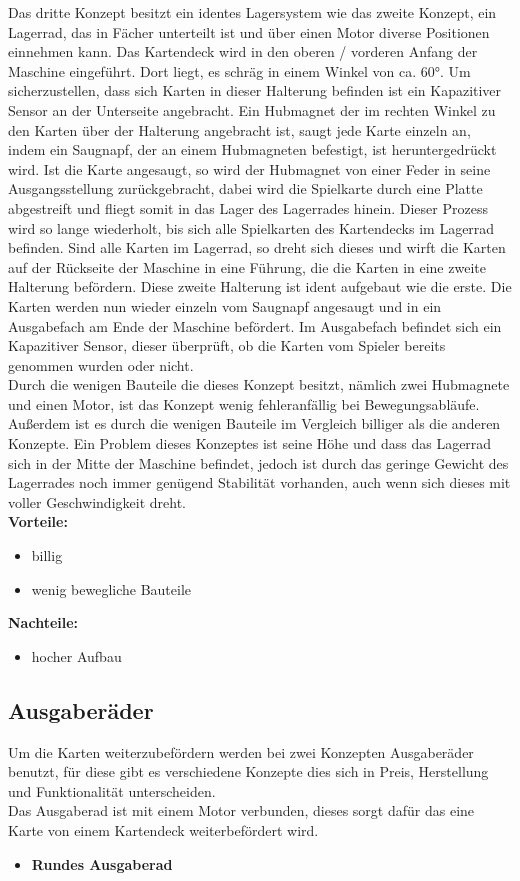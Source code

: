 Das dritte Konzept besitzt ein identes Lagersystem wie das zweite Konzept, ein Lagerrad, das in Fächer unterteilt ist und über einen Motor diverse Positionen einnehmen kann.
Das Kartendeck wird in den oberen / vorderen Anfang der Maschine eingeführt. Dort liegt, es schräg in einem Winkel von ca. 60°. Um sicherzustellen, dass sich Karten in dieser Halterung befinden
ist ein Kapazitiver Sensor an der Unterseite angebracht. Ein Hubmagnet der im rechten Winkel zu den Karten über der Halterung angebracht ist, saugt jede Karte einzeln an, indem ein Saugnapf, der an einem Hubmagneten
befestigt, ist heruntergedrückt wird. Ist die Karte angesaugt, so wird der Hubmagnet von einer Feder in seine Ausgangsstellung zurückgebracht, dabei wird die Spielkarte durch eine Platte abgestreift und fliegt somit in das Lager des
Lagerrades hinein. Dieser Prozess wird so lange wiederholt, bis sich alle Spielkarten des Kartendecks im Lagerrad befinden. Sind alle Karten im Lagerrad, so dreht sich dieses und wirft die Karten auf der Rückseite der Maschine in eine Führung, die die Karten in eine zweite Halterung befördern. Diese zweite Halterung ist ident aufgebaut wie die erste. Die Karten werden nun wieder einzeln vom Saugnapf angesaugt und in ein Ausgabefach am Ende der Maschine befördert. Im Ausgabefach befindet sich
ein Kapazitiver Sensor, dieser überprüft, ob die Karten vom Spieler bereits genommen wurden oder nicht.\\

Durch die wenigen Bauteile die dieses Konzept besitzt, nämlich zwei Hubmagnete und einen Motor, ist das Konzept wenig fehleranfällig bei Bewegungsabläufe. Außerdem ist es
durch die wenigen Bauteile im Vergleich billiger als die anderen Konzepte. Ein Problem dieses Konzeptes ist seine Höhe und dass das Lagerrad sich in der Mitte der Maschine befindet,
jedoch ist durch das geringe Gewicht des Lagerrades noch immer genügend Stabilität vorhanden, auch wenn sich dieses mit voller Geschwindigkeit dreht. \\

\textbf{Vorteile:}
\begin{itemize}
    \item billig
    \item wenig bewegliche Bauteile
\end{itemize}
\textbf{Nachteile:}
\begin{itemize}
    \item hocher Aufbau
\end{itemize}

\subsection{Ausgaberäder}
Um die Karten weiterzubefördern werden bei zwei Konzepten Ausgaberäder benutzt, für diese gibt es verschiedene Konzepte dies sich in Preis, Herstellung und Funktionalität unterscheiden.\\
Das Ausgaberad ist mit einem Motor verbunden, dieses sorgt dafür das eine Karte von einem Kartendeck weiterbefördert wird.
\begin{itemize}
    \item \textbf{Rundes Ausgaberad}
\end{itemize}

